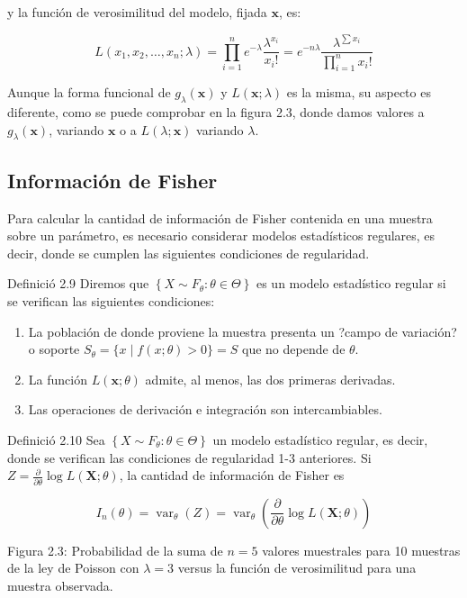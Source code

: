 \documentclass[
]{article}
\providecommand{\tightlist}{%
  \setlength{\itemsep}{0pt}\setlength{\parskip}{0pt}}
\begin{document}
y la función de verosimilitud del modelo, fijada \(\mathbf{x}\), es:

\[
L\left(x_{1}, x_{2}, \ldots, x_{n} ; \lambda\right)=\prod_{i=1}^{n} e^{-\lambda} \frac{\lambda^{x_{i}}}{x_{i}!}=e^{-n \lambda} \frac{\lambda^{\sum x_{i}}}{\prod_{i=1}^{n} x_{i}!}
\]

Aunque la forma funcional de \(g_{\lambda}(\mathbf{x})\) y \(L(\mathbf{x} ; \lambda)\) es la misma, su aspecto es diferente, como se puede comprobar en la figura 2.3, donde damos valores a \(g_{\lambda}(\mathbf{x})\), variando \(\mathbf{x}\) o a \(L(\lambda ; \mathbf{x})\) variando \(\lambda\).

\subsection{Información de Fisher}\label{informaciuxf3n-de-fisher}

Para calcular la cantidad de información de Fisher contenida en una muestra sobre un parámetro, es necesario considerar modelos estadísticos regulares, es decir, donde se cumplen las siguientes condiciones de regularidad.

Definició 2.9 Diremos que \(\left\{X \sim F_{\theta}: \theta \in \Theta\right\}\) es un modelo estadístico regular si se verifican las siguientes condiciones:

\begin{enumerate}
\def\labelenumi{\arabic{enumi}.}
\tightlist
\item
  La población de donde proviene la muestra presenta un ?campo de variación? o soporte \(S_{\theta}=\{x \mid f(x ; \theta)>0\}=S\) que no depende de \(\theta\).
\item
  La función \(L(\mathbf{x} ; \theta)\) admite, al menos, las dos primeras derivadas.
\item
  Las operaciones de derivación e integración son intercambiables.
\end{enumerate}

Definició 2.10 Sea \(\left\{X \sim F_{\theta}: \theta \in \Theta\right\}\) un modelo estadístico regular, es decir, donde se verifican las condiciones de regularidad 1-3 anteriores. Si \(Z=\frac{\partial}{\partial \theta} \log L(\mathbf{X} ; \theta)\), la cantidad de información de Fisher es

\[
I_{n}(\theta)=\operatorname{var}_{\theta}(Z)=\operatorname{var}_{\theta}\left(\frac{\partial}{\partial \theta} \log L(\mathbf{X} ; \theta)\right)
\]

Figura 2.3: Probabilidad de la suma de \(n=5\) valores muestrales para 10 muestras de la ley de Poisson con \(\lambda=3\) versus la función de verosimilitud para una muestra observada.
\end{document}

